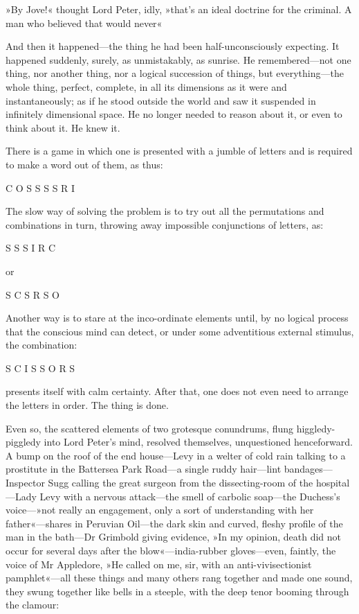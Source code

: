 »By Jove!« thought Lord Peter, idly, »that's an ideal doctrine for the criminal. A man who believed that would never\longdash«

And then it happened—the thing he had been half-unconsciously expecting. It happened suddenly, surely, as unmistakably, as sunrise. He remembered—not one thing, nor another thing, nor a logical succession of things, but everything—the whole thing, perfect, complete, in all its dimensions as it were and instantaneously; as if he stood outside the world and saw it suspended in infinitely dimensional space. He no longer needed to reason about it, or even to think about it. He knew it.

There is a game in which one is presented with a jumble of letters and is required to make a word out of them, as thus:

\begin{center}
\textsc{C O S S S S R I}
\end{center}

The slow way of solving the problem is to try out all the permutations and combinations in turn, throwing away impossible conjunctions of letters, as:

\begin{center}
\textsc{S S S I R C}
\end{center}

or

\begin{center}
\textsc{S C S R S O}
\end{center}

Another way is to stare at the inco-ordinate elements until, by no logical process that the conscious mind can detect, or under some adventitious external stimulus, the combination:

\begin{center}
\textsc{S C I S S O R S}
\end{center}

presents itself with calm certainty. After that, one does not even need to arrange the letters in order. The thing is done.

Even so, the scattered elements of two grotesque conundrums, flung higgledy-piggledy into Lord Peter's mind, resolved themselves, unquestioned henceforward. A bump on the roof of the end house—Levy in a welter of cold rain talking to a prostitute in the Battersea Park Road—a single ruddy hair—lint bandages—Inspector Sugg calling the great surgeon from the dissecting-room of the hospital—Lady Levy with a nervous attack—the smell of carbolic soap—the Duchess's voice---»not really an engagement, only a sort of understanding with her father«---shares in Peruvian Oil—the dark skin and curved, fleshy profile of the man in the bath—Dr Grimbold giving evidence, »In my opinion, death did not occur for several days after the blow«---india-rubber gloves—even, faintly, the voice of Mr Appledore, »He called on me, sir, with an anti-vivisectionist pamphlet«---all these things and many others rang together and made one sound, they swung together like bells in a steeple, with the deep tenor booming through the clamour:

